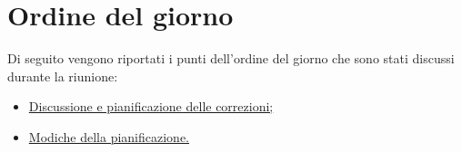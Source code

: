 \clearpage
\section{Ordine del giorno}
Di seguito vengono riportati i punti dell’ordine del giorno che sono stati discussi durante la riunione:
\begin{itemize}
	\item \hyperref[sec:correzioni]{Discussione e pianificazione delle correzioni;}
	\item \hyperref[sec:pianificazione]{Modiche della pianificazione.}
\end{itemize}
